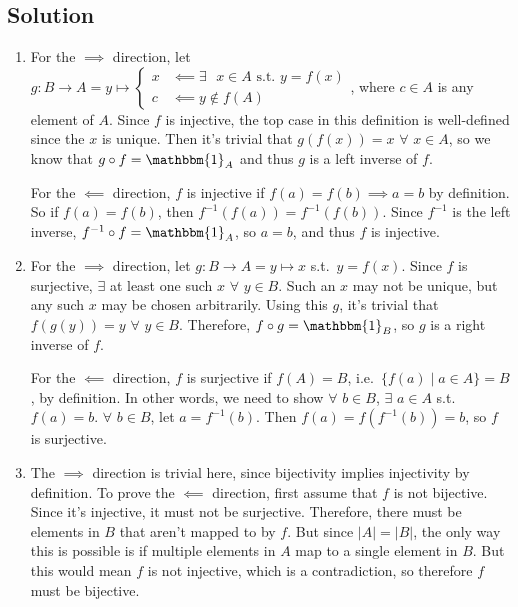 \documentclass[fleqn]{article}
\begin{document}
        \subsection{Solution}
        \begin{enumerate}
            
            \item 
            For the $\implies$ direction, let $g: B \to A = y \mapsto
                \begin{cases}
                    x & \impliedby \exists \text{ } x \in A \text{ s.t. } y = f(x) \\
                    c & \impliedby y \notin f(A)
                \end{cases}
            $, where $c \in A$ is any element of $A$.  Since $f$ is injective, the top case in this definition is well-defined since the $x$ is unique.  Then it's trivial that $g(f(x)) = x$ $\forall$ $x \in A$, so we know that $g \circ f = \mathbbm{1}_A$ and thus $g$ is a left inverse of $f$.
            
            For the $\impliedby$ direction, $f$ is injective if $f(a) = f(b) \implies a = b$ by definition.  So if $f(a) = f(b)$, then $f^{-1}(f(a)) = f^{-1}(f(b))$.  Since $f^{-1}$ is the left inverse, $f^{-1} \circ f = \mathbbm{1}_A$, so $a = b$, and thus $f$ is injective.
            
            \item
            For the $\implies$ direction, let $g: B \to A = y \mapsto x$ s.t.\ $y = f(x)$.  Since $f$ is surjective, $\exists$ at least one such $x$ $\forall$ $y \in B$.  Such an $x$ may not be unique, but any such $x$ may be chosen arbitrarily.  Using this $g$, it's trivial that $f(g(y)) = y$ $\forall$ $y \in B$.  Therefore, $f \circ g = \mathbbm{1}_B$, so $g$ is a right inverse of $f$.
            
            For the $\impliedby$ direction, $f$ is surjective if $f(A) = B$, i.e.\ $\{f(a) \mid a \in A\} = B$, by definition.  In other words, we need to show $\forall$ $b \in B$, $\exists$ $a \in A$ s.t.\ $f(a) = b$.  $\forall$ $b \in B$, let $a = f^{-1}(b)$.  Then $f(a) = f(f^{-1}(b)) = b$, so $f$ is surjective.
            
            \item The $\implies$ direction is trivial here, since bijectivity implies injectivity by definition.  To prove the $\impliedby$ direction, first assume that $f$ is not bijective.  Since it's injective, it must not be surjective.  Therefore, there must be elements in $B$ that aren't mapped to by $f$.  But since $|A| = |B|$, the only way this is possible is if multiple elements in $A$ map to a single element in $B$.  But this would mean $f$ is not injective, which is a contradiction, so therefore $f$ must be bijective. 
            
        \end{enumerate}
    
\end{document}
